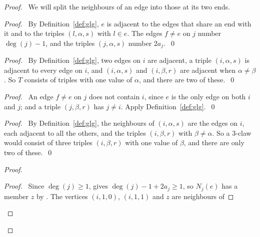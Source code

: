 \begin{proof}
 \pfsketch\ We will split the neighbours of an edge into those at its two ends.
 \begin{proof}\pf\ By Definition~\ref{def:glg}, $e$ is adjacent to the edges that share an end
  with it and to the triples $(l,\alpha,s)$ with $l\in e$. The edges $f\ne e$ on $j$ number
  $\deg(j)-1$, and the triples $(j,\alpha,s)$ number $2a_j$.~\qed\end{proof}
 \begin{proof}\pf\ By Definition~\ref{def:glg}, two edges on $i$ are adjacent, a triple
  $(i,\alpha,s)$ is adjacent to every edge on $i$, and $(i,\alpha,s)$ and $(i,\beta,r)$ are
  adjacent when $\alpha\ne\beta$. So $T$ consists of triples with one value of $\alpha$, and
  there are two of these.~\qed\end{proof}
 \begin{proof}\pf\ An edge $f\ne e$ on $j$ does not contain $i$, since $e$ is the only edge on
  both $i$ and $j$; and a triple $(j,\beta,r)$ has $j\ne i$. Apply
  Definition~\ref{def:glg}.~\qed\end{proof}
 \begin{proof}\pf\ By Definition~\ref{def:glg}, the neighbours of $(i,\alpha,s)$ are the edges on
  $i$, each adjacent to all the others, and the triples $(i,\beta,r)$ with $\beta\ne\alpha$. So a
  3-claw would consist of three triples $(i,\beta,r)$ with one value of $\beta$, and there are
  only two of these.~\qed\end{proof}
 \begin{proof}
  \begin{proof}\pf\ Since $\deg(j)\ge1$,  gives $\deg(j)-1+2a_j\ge1$, so $N_j(e)$ has a
   member $z$ by . The vertices $(i,1,0)$, $(i,1,1)$ and $z$ are neighbours of

\end{proof}
\end{proof}
\end{proof}
